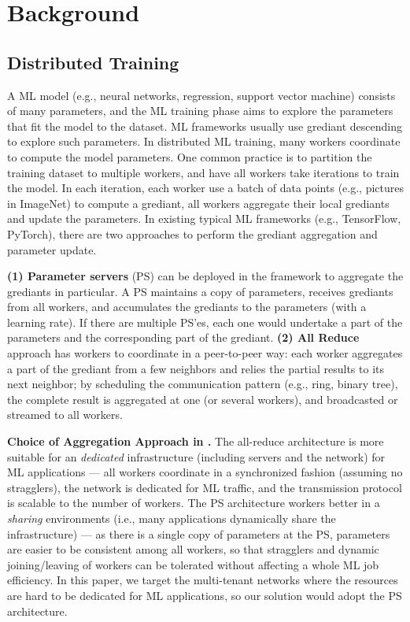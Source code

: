 \section{Background}
\subsection{Distributed Training}
A ML model (e.g., neural networks, regression, support vector machine) 
consists of many parameters, and the ML training phase aims to explore the 
parameters that fit the model to the dataset. ML frameworks usually use 
grediant descending to explore such parameters.
In distributed ML training, many workers coordinate to compute the model parameters. 
One common practice is to partition the training dataset to multiple workers,
and have all workers take iterations to train the model.
In each iteration, each worker use a batch of data points (e.g., pictures in ImageNet)
to compute a grediant, all workers aggregate their local grediants and update the parameters.
In existing typical ML frameworks (e.g., TensorFlow, PyTorch),
there are two approaches to perform the grediant aggregation and parameter update.

\textbf{(1) Parameter servers} (PS) can be deployed in the framework to aggregate the grediants 
in particular. A PS maintains a copy of parameters, receives grediants from all workers, and 
accumulates the grediants to the parameters (with a learning rate). If there are multiple PS'es,
each one would undertake a part of the parameters and the corresponding part of the grediant.
\textbf{(2) All Reduce} approach has workers to coordinate in a peer-to-peer way: each worker 
aggregates a part of the grediant from a few neighbors and relies the partial results to its next neighbor;
by scheduling the communication pattern (e.g., ring, binary tree), the complete result
is aggregated at one (or several workers), and broadcasted or streamed to all workers.




\textbf{Choice of Aggregation Approach in \sysname.} The all-reduce architecture is more suitable for 
an \emph{dedicated} infrastructure (including servers and the network) for ML applications ---
all workers coordinate in a synchronized fashion (assuming no stragglers), the
network is dedicated for ML traffic, and the transmission protocol is scalable to the 
number of workers. The PS architecture workers better in a \emph{sharing} environments 
(i.e., many applications dynamically share the infrastructure) --- 
as there is a single copy of parameters at the PS, parameters are easier to be consistent
among all workers, so that stragglers and dynamic joining/leaving of workers can be tolerated
without affecting a whole ML job efficiency. In this paper, we target the multi-tenant networks
where the resources are hard to be dedicated for ML applications, so our solution would 
adopt the PS architecture.
 

